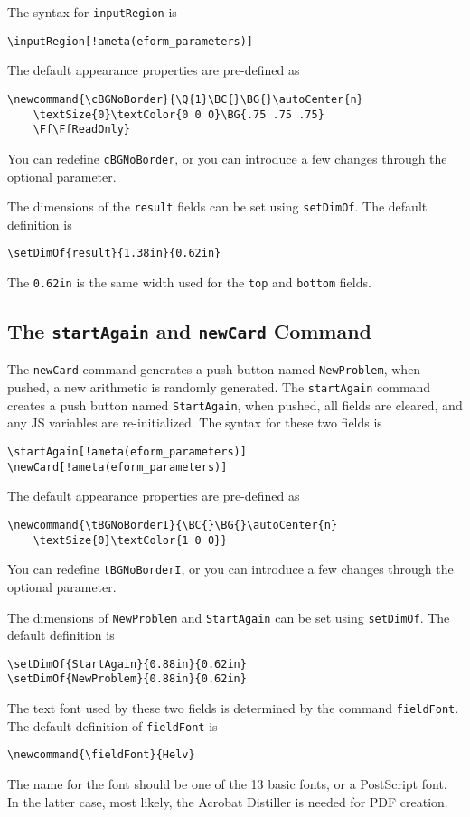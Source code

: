 \documentclass{article}
\makeatletter
\let\bslash=\@backslashchar
\def\cs#1{\texttt{\bslash#1}}
\makeatother
\begin{document}
The syntax for \cs{inputRegion} is
\begin{Verbatim}[xleftmargin=\amtIndent,commandchars=!()]
\inputRegion[!ameta(eform_parameters)]
\end{Verbatim}
The default appearance properties are pre-defined as
\begin{Verbatim}[xleftmargin=\amtIndent]
\newcommand{\cBGNoBorder}{\Q{1}\BC{}\BG{}\autoCenter{n}
    \textSize{0}\textColor{0 0 0}\BG{.75 .75 .75}
    \Ff\FfReadOnly}
\end{Verbatim}
You can redefine \cs{cBGNoBorder}, or you can introduce a few changes through
the optional parameter.

The dimensions of the \texttt{result} fields can be set using \cs{setDimOf}.
The default definition is
\begin{Verbatim}[xleftmargin=\amtIndent]
\setDimOf{result}{1.38in}{0.62in}
\end{Verbatim}
The \texttt{0.62in} is the same width used for the \texttt{top} and \texttt{bottom} fields.

\subsection{The \texorpdfstring{\protect\cs{startAgain}}{}
    and \texorpdfstring{\protect\cs{newCard}} {} Command}\label{startAgainnewCard}

The \cs{newCard} command generates a push button named \texttt{NewProblem},
when pushed, a new arithmetic is randomly generated. The \cs{startAgain}
command creates a push button named \texttt{StartAgain}, when pushed, all
fields are cleared, and any JS variables are re-initialized. The syntax for
these two fields is
\begin{Verbatim}[xleftmargin=\amtIndent,commandchars=!()]
\startAgain[!ameta(eform_parameters)]
\newCard[!ameta(eform_parameters)]
\end{Verbatim}
The default appearance properties are pre-defined as
\begin{Verbatim}[xleftmargin=\amtIndent]
\newcommand{\tBGNoBorderI}{\BC{}\BG{}\autoCenter{n}
    \textSize{0}\textColor{1 0 0}}
\end{Verbatim}
You can redefine \cs{tBGNoBorderI}, or you can introduce a few changes
through the optional parameter.

The dimensions of \texttt{NewProblem} and \texttt{StartAgain} can be set
using \cs{setDimOf}. The default definition is
\begin{Verbatim}[xleftmargin=\amtIndent]
\setDimOf{StartAgain}{0.88in}{0.62in}
\setDimOf{NewProblem}{0.88in}{0.62in}
\end{Verbatim}
The text font used by these two fields is determined by the command
\cs{fieldFont}. The default definition of \cs{fieldFont} is
\begin{Verbatim}[xleftmargin=\amtIndent]
\newcommand{\fieldFont}{Helv}
\end{Verbatim}
The name for the font should be one of the 13 basic fonts, or a PostScript
font. In the latter case, most likely, the Acrobat Distiller is needed for
PDF creation.
\end{document}
